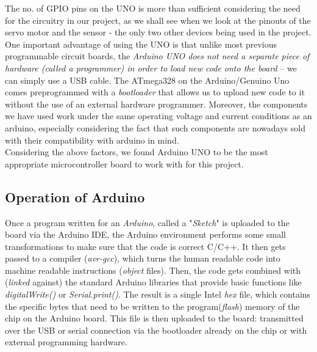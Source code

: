  The no. of GPIO pins on the UNO is more than sufficient considering the need for the circuitry in our project, as we shall see when we look at the pinouts of the servo motor and the sensor - the only two other devices being used in the project. \vspace{0.1cm} \linebreak
 One important advantage of using the UNO is that unlike most previous programmable circuit boards, the \textit{Arduino UNO does not need a separate piece of hardware (called a programmer) in order to load new code onto the board} – we can simply use a USB cable. The ATmega328 on the Arduino/Genuino Uno comes preprogrammed with a \textit{bootloader} that allows us to upload new code to it without the use of an external hardware programmer. \vspace{0.1cm} \linebreak
 Moreover, the components we have used work under the same operating voltage and current conditions as an arduino, especially considering the fact that such components are nowadays sold with their compatibility with arduino in mind.\\
 
 Considering the above factors, we found Arduino UNO to be the most appropriate microcontroller board to work with for this project.\\
 
\subsection{Operation of Arduino}
Once a program written for an \textit{Arduino}, called a "\textit{Sketch}" is uploaded to the board via the Arduino IDE, the Arduino environment performs some small transformations to make sure that the code is correct C/C++. It then gets passed to a compiler (\textit{avr-gcc}), which turns the human readable code into machine readable instructions (\textit{object }files). Then, the code gets combined with (\textit{linked} against) the standard Arduino libraries that provide basic functions like \emph{digitalWrite()} or \emph{Serial.print()}. The result is a single Intel \emph{hex} file, which contains the specific bytes that need to be written to the program(\textit{flash}) memory of the chip on the Arduino board. This file is then uploaded to the board: transmitted over the USB or serial connection via the bootloader already on the chip or with external programming hardware.

